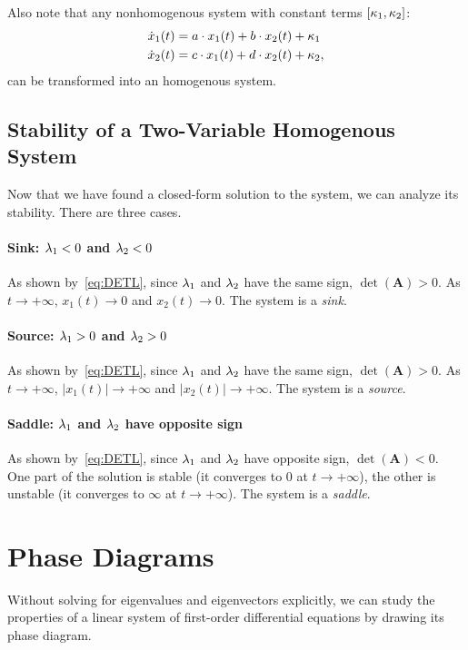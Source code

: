\documentclass[letterpaper,12pt,leqno]{article}
\begin{document}
Also note that any nonhomogenous system with constant terms $\left[ \kappa_{1},\kappa_{2} \right]$:
\begin{align*}
\dot{x}_{1}(t) &=a\cdot x_{1}(t)+b\cdot x_{2}(t)+\kappa_{1} \\
\dot{x}_{2}(t) &=c\cdot x_{1}(t)+d\cdot x_{2}(t)+\kappa_{2},
\end{align*}
can be transformed into an homogenous system.

\subsection{Stability of a Two-Variable Homogenous System}

Now that we have found a closed-form solution to the system, we can analyze its stability. There are three cases.

\paragraph{Sink: $\lambda_{1}<0$ and $\lambda_{2}<0$} As shown by~\eqref{eq:DETL}, since $\lambda_{1}$ and $\lambda_{2}$ have the same sign, $\det(\bm{A}) >0$. As $t\to +\infty$, $x_{1}(t)\to 0$ and $x_{2}(t)\to 0$. The system is a \textit{sink}.

\paragraph{Source: $\lambda_{1}>0$ and $\lambda_{2}>0$} As shown by~\eqref{eq:DETL}, since $\lambda_{1}$ and $\lambda_{2}$ have the same sign, $\det(\bm{A}) >0$. As $t\to +\infty$, $|x_{1}(t)|\to +\infty$ and $|x_{2}(t)|\to +\infty$. The system is a \textit{source}.

\paragraph{Saddle: $\lambda_{1}$ and $\lambda_{2}$ have opposite sign} As shown by~\eqref{eq:DETL}, since $\lambda_{1}$ and $\lambda_{2}$ have opposite sign, $\det(\bm{A}) <0$. One part of the solution is stable (it converges to 0 at $t\to +\infty$), the other is unstable (it converges to $\infty$ at $t\to +\infty$). The system is a \textit{saddle}.


\section{Phase Diagrams}\label{sec:three}

Without solving for eigenvalues and eigenvectors explicitly, we can study the properties of a linear system of first-order differential equations by drawing its phase diagram. 
\end{document}
